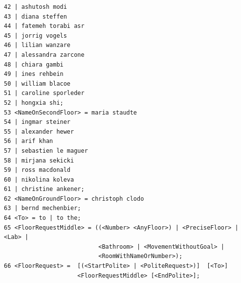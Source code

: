 \documentclass[a4paper, 12pt]{article}
\begin{document}
\begin{verbatim}
42 | ashutosh modi
43 | diana steffen
44 | fatemeh torabi asr
45 | jorrig vogels
46 | lilian wanzare
47 | alessandra zarcone
48 | chiara gambi
49 | ines rehbein
50 | william blacoe
51 | caroline sporleder
52 | hongxia shi;
53 <NameOnSecondFloor> = maria staudte
54 | ingmar steiner
55 | alexander hewer
56 | arif khan
57 | sebastien le maguer
58 | mirjana sekicki
59 | ross macdonald
60 | nikolina koleva
61 | christine ankener;
62 <NameOnGroundFloor> = christoph clodo
63 | bernd mechenbier;
64 <To> = to | to the;
65 <FloorRequestMiddle> = ((<Number> <AnyFloor>) | <PreciseFloor> | <Lab> | 
                           <Bathroom> | <MovementWithoutGoal> |  
                           <RoomWithNameOrNumber>);
66 <FloorRequest> =  [(<StartPolite> | <PoliteRequest>)]  [<To>]
                     <FloorRequestMiddle> [<EndPolite>];
\end{verbatim}

\cleardoublepage


\end{document}
